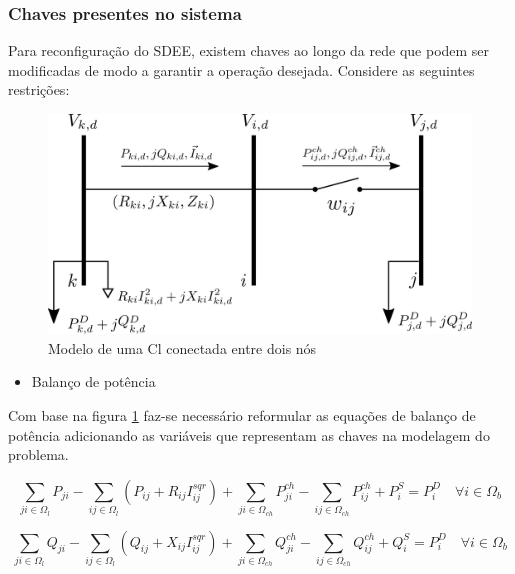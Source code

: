 \subsubsection{Chaves presentes no sistema}

Para reconfiguração do SDEE, existem chaves ao longo da rede que podem ser modificadas de modo a garantir a operação desejada.
Considere as seguintes restrições:

\begin{figure}[h]
    \centering
    \includegraphics[scale = 1.5]{01_img/diagrama_chaves.png}
    \caption{Modelo de uma Cl conectada entre dois nós}
    \label{fig:diagrama_chave}
\end{figure}
    
\begin{itemize}
    \item Balanço de potência
\end{itemize}
    Com base na figura \ref{fig:diagrama_chave} faz-se necessário reformular as equações de balanço de potência adicionando as variáveis que representam as chaves na modelagem do problema.
    
\begin{equation}
    \sum_{ji\in\Omega_{l}}P_{ji} - \sum_{ij\in\Omega_{l}}(P_{ij} + R_{ij}I_{ij}^{sqr})+ \sum_{ji\in\Omega_{ch}}P_{ji}^{ch} -\sum_{ij\in\Omega_{ch}}P_{ij}^{ch} + P_{i}^{S} = P_{i}^{D}\quad\forall i \in\Omega_{b}\label{eq:fluxo_pot_ativa_chaves}  
\end{equation}
    
    
\begin{equation}
    \sum_{ji\in\Omega_{l}}Q_{ji} - \sum_{ij\in\Omega_{l}}(Q_{ij} + X_{ij}I_{ij}^{sqr})+ \sum_{ji\in\Omega_{ch}}Q_{ji}^{ch} -\sum_{ij\in\Omega_{ch}}Q_{ij}^{ch} + Q_{i}^{S} = P_{i}^{D}\quad\forall i \in\Omega_{b}
    \label{eq:fluxo_pot_reativa_chaves}
\end{equation}
    
